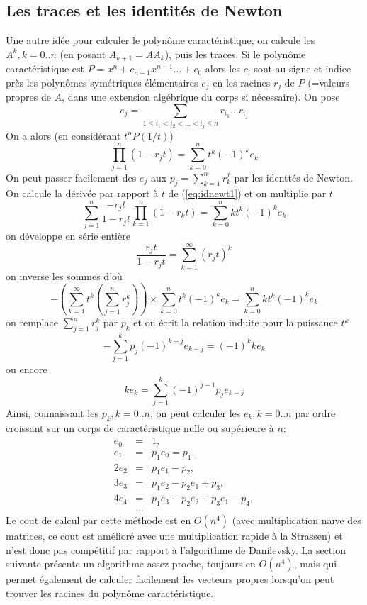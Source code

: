 \documentclass[a4paper,11pt]{book}
\begin{document}
\begin{giacjshere}
\subsection{Les traces et les identit\'es de Newton}
Une autre id\'ee pour calculer le polyn\^ome caract\'eristique,
on calcule les $A^k, k=0..n$ (en posant $A_{k+1}=AA_k$), puis les
traces. Si le polyn\^ome caract\'eristique est $P=x^n+c_{n-1}x^{n-1}...+c_0$
alors les $c_i$ sont au signe et indice pr\`es les polyn\^omes
sym\'etriques \'el\'ementaires $e_j$ en les racines $r_j$ de $P$  
(=valeurs propres de $A$, dans une extension
alg\'ebrique du corps si n\'ecessaire). On pose
$$ e_j=\sum_{1\leq i_1<i_2<...<i_j\leq n} r_{i_1}...r_{i_j} $$
On a alors (en consid\'erant $t^nP(1/t)$)
\begin{equation}\label{eq:idnewt1}
\prod_{j=1}^n(1-r_jt)=\sum_{k=0}^n t^k (-1)^k e_k
\end{equation}
On peut passer facilement des $e_j$ aux $ p_j=\sum_{k=1}^n r_k^j$ par
les identt\'es de Newton. On calcule la d\'eriv\'ee par rapport \`a $t$
de (\ref{eq:idnewt1}) et on multiplie par $t$
$$ \sum_{j=1}^n \frac{-r_jt}{1-r_jt} \prod_{k=1}^n(1-r_kt) 
=\sum_{k=0}^n kt^k (-1)^k e_k  $$
on d\'eveloppe en s\'erie enti\`ere 
$$\frac{r_jt}{1-r_jt}=\sum_{k=1}^\infty (r_jt)^k$$
on inverse les sommes d'o\`u
$$ -\left(\sum_{k=1}^\infty t^k (\sum_{j=1}^n r_j^k) \right) 
\times \sum_{k=0}^n t^k (-1)^k e_k = \sum_{k=0}^n k t^k (-1)^k e_k$$
on remplace $\sum_{j=1}^n r_j^k$ par $p_k$ et
on \'ecrit la relation induite pour la puissance $t^k$
$$ -\sum_{j=1}^k p_j (-1)^{k-j} e_{k-j} =(-1)^k ke_k$$
ou encore
$$ ke_k=\sum_{j=1}^k  (-1)^{j-1} p_j e_{k-j}$$
Ainsi, connaissant les $p_k, k=0..n$, 
on peut calculer les $e_k,k=0..n$ par ordre croissant sur un corps
de caract\'eristique nulle ou sup\'erieure \`a $n$:
\begin{eqnarray*}
 e_0&=&1, \\ 
e_1&=&p_1e_0=p_1, \\ 
2e_2&=&p_1e_1-p_2,\\
3e_3&=&p_1e_2-p_2e_1+p_3, \\
4e_4&=& p_1e_3-p_2e_2+p_3e_1-p_4, \\
&...&
\end{eqnarray*}
Le cout de calcul par cette m\'ethode est en $O(n^4)$ 
(avec multiplication na\"ive
des matrices, ce cout est am\'elior\'e avec une multiplication
rapide \`a la Strassen) 
et n'est donc pas comp\'etitif par rapport \`a 
l'algorithme de Danilevsky. La section suivante pr\'esente un
algorithme assez proche, toujours en $O(n^4)$, mais qui permet 
\'egalement de calculer facilement les vecteurs propres lorsqu'on
peut trouver les racines du polyn\^ome caract\'eristique.


\end{giacjshere}
\end{document}
